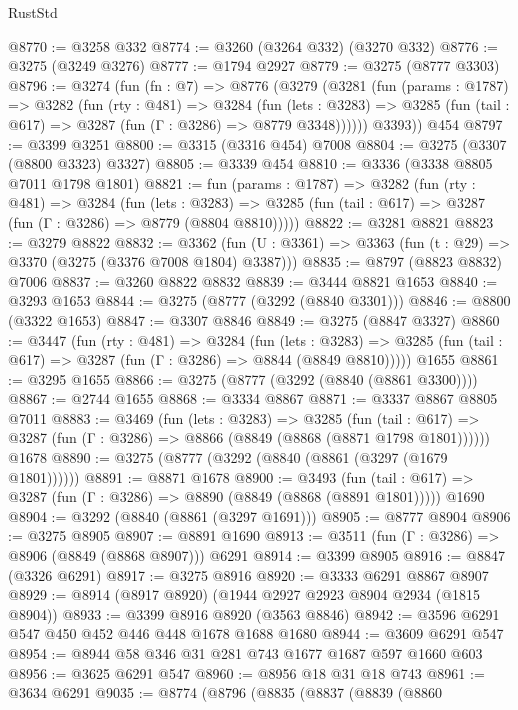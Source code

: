 \begin{lexlean}{RustStd}
\begin{coremodule}
@8770 := @3258 @332
@8774 := @3260 (@3264 @332) (@3270 @332)
@8776 := @3275 (@3249 @3276)
@8777 := @1794 @2927
@8779 := @3275 (@8777 @3303)
@8796 := @3274
    (fun (fn : @7) =>
    @8776
      (@3279
        (@3281
          (fun (params : @1787) =>
          @3282
            (fun (rty : @481) =>
            @3284
              (fun (lets : @3283) =>
              @3285 (fun (tail : @617) => @3287 (fun (Γ : @3286) => @8779 @3348))))))
        @3393))
    @454
@8797 := @3399 @3251
@8800 := @3315 (@3316 @454) @7008
@8804 := @3275 (@3307 (@8800 @3323) @3327)
@8805 := @3339 @454
@8810 := @3336 (@3338 @8805 @7011 @1798 @1801)
@8821 := fun (params : @1787) =>
  @3282
    (fun (rty : @481) =>
    @3284
      (fun (lets : @3283) =>
      @3285 (fun (tail : @617) => @3287 (fun (Γ : @3286) => @8779 (@8804 @8810)))))
@8822 := @3281 @8821
@8823 := @3279 @8822
@8832 := @3362 (fun (U : @3361) => @3363 (fun (t : @29) => @3370 (@3275 (@3376 @7008 @1804) @3387)))
@8835 := @8797 (@8823 @8832) @7006
@8837 := @3260 @8822 @8832
@8839 := @3444 @8821 @1653
@8840 := @3293 @1653
@8844 := @3275 (@8777 (@3292 (@8840 @3301)))
@8846 := @8800 (@3322 @1653)
@8847 := @3307 @8846
@8849 := @3275 (@8847 @3327)
@8860 := @3447
    (fun (rty : @481) =>
    @3284
      (fun (lets : @3283) =>
      @3285 (fun (tail : @617) => @3287 (fun (Γ : @3286) => @8844 (@8849 @8810)))))
    @1655
@8861 := @3295 @1655
@8866 := @3275 (@8777 (@3292 (@8840 (@8861 @3300))))
@8867 := @2744 @1655
@8868 := @3334 @8867
@8871 := @3337 @8867 @8805 @7011
@8883 := @3469
    (fun (lets : @3283) =>
    @3285
      (fun (tail : @617) => @3287 (fun (Γ : @3286) => @8866 (@8849 (@8868 (@8871 @1798 @1801))))))
    @1678
@8890 := @3275 (@8777 (@3292 (@8840 (@8861 (@3297 (@1679 @1801))))))
@8891 := @8871 @1678
@8900 := @3493
    (fun (tail : @617) => @3287 (fun (Γ : @3286) => @8890 (@8849 (@8868 (@8891 @1801)))))
    @1690
@8904 := @3292 (@8840 (@8861 (@3297 @1691)))
@8905 := @8777 @8904
@8906 := @3275 @8905
@8907 := @8891 @1690
@8913 := @3511 (fun (Γ : @3286) => @8906 (@8849 (@8868 @8907))) @6291
@8914 := @3399 @8905
@8916 := @8847 (@3326 @6291)
@8917 := @3275 @8916
@8920 := @3333 @6291 @8867 @8907
@8929 := @8914 (@8917 @8920) (@1944 @2927 @2923 @8904 @2934 (@1815 @8904))
@8933 := @3399 @8916 @8920 (@3563 @8846)
@8942 := @3596 @6291 @547 @450 @452 @446 @448 @1678 @1688 @1680
@8944 := @3609 @6291 @547
@8954 := @8944 @58 @346 @31 @281 @743 @1677 @1687 @597 @1660 @603
@8956 := @3625 @6291 @547
@8960 := @8956 @18 @31 @18 @743
@8961 := @3634 @6291
@9035 := @8774
    (@8796
      (@8835
        (@8837
          (@8839
            (@8860

\end{coremodule}
\end{lexlean}

